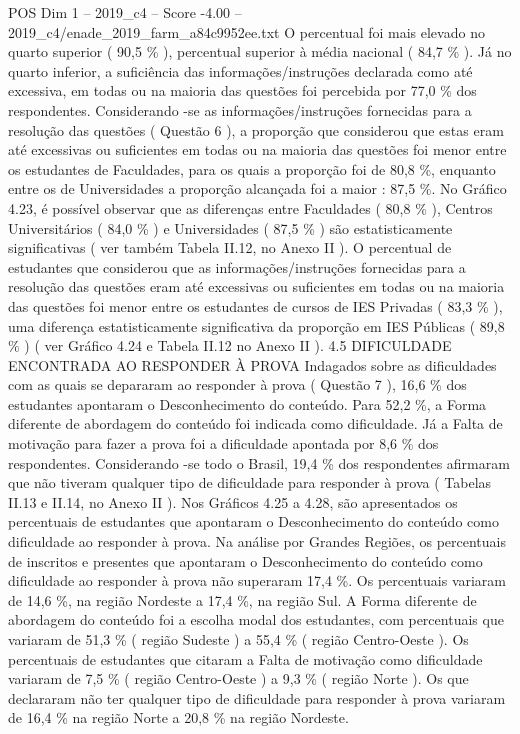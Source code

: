 \begin{textsample}{POS Dim 1 – 2019\_c4 – Score -4.00 – 2019\_c4/enade\_2019\_farm\_a84c9952ee.txt}
O percentual foi mais elevado no quarto superior ( 90,5 \% ), percentual superior à média nacional ( 84,7 \% ).
Já no quarto inferior, a suficiência das informações/instruções declarada como até excessiva, em todas ou na maioria das questões foi percebida por 77,0 \% dos respondentes.
Considerando -se as informações/instruções fornecidas para a resolução das questões ( Questão 6 ), a proporção que considerou que estas eram até excessivas ou suficientes em todas ou na maioria das questões foi menor entre os estudantes de Faculdades, para os quais a proporção foi de 80,8 \%, enquanto entre os de Universidades a proporção alcançada foi a maior : 87,5 \%.
No Gráfico 4.23, é possível observar que as diferenças entre Faculdades ( 80,8 \% ), Centros Universitários ( 84,0 \% ) e Universidades ( 87,5 \% ) são estatisticamente significativas ( ver também Tabela II.12, no Anexo II ).
O percentual de estudantes que considerou que as informações/instruções fornecidas para a resolução das questões eram até excessivas ou suficientes em todas ou na maioria das questões foi menor entre os estudantes de cursos de IES Privadas ( 83,3 \% ), uma diferença estatisticamente significativa da proporção em IES Públicas ( 89,8 \% ) ( ver Gráfico 4.24 e Tabela II.12 no Anexo II ). 4.5 DIFICULDADE ENCONTRADA AO RESPONDER À PROVA Indagados sobre as dificuldades com as quais se depararam ao responder à prova ( Questão 7 ), 16,6 \% dos estudantes apontaram o Desconhecimento do conteúdo.
Para 52,2 \%, a Forma diferente de abordagem do conteúdo foi indicada como dificuldade.
Já a Falta de motivação para fazer a prova foi a dificuldade apontada por 8,6 \% dos respondentes.
Considerando -se todo o Brasil, 19,4 \% dos respondentes afirmaram que não tiveram qualquer tipo de dificuldade para responder à prova ( Tabelas II.13 e II.14, no Anexo II ).
Nos Gráficos 4.25 a 4.28, são apresentados os percentuais de estudantes que apontaram o Desconhecimento do conteúdo como dificuldade ao responder à prova.
Na análise por Grandes Regiões, os percentuais de inscritos e presentes que apontaram o Desconhecimento do conteúdo como dificuldade ao responder à prova não superaram 17,4 \%.
Os percentuais variaram de 14,6 \%, na região Nordeste a 17,4 \%, na região Sul.
A Forma diferente de abordagem do conteúdo foi a escolha modal dos estudantes, com percentuais que variaram de 51,3 \% ( região Sudeste ) a 55,4 \% ( região Centro-Oeste ).
Os percentuais de estudantes que citaram a Falta de motivação como dificuldade variaram de 7,5 \% ( região Centro-Oeste ) a 9,3 \% ( região Norte ).
Os que declararam não ter qualquer tipo de dificuldade para responder à prova variaram de 16,4 \% na região Norte a 20,8 \% na região Nordeste.

\end{textsample}
